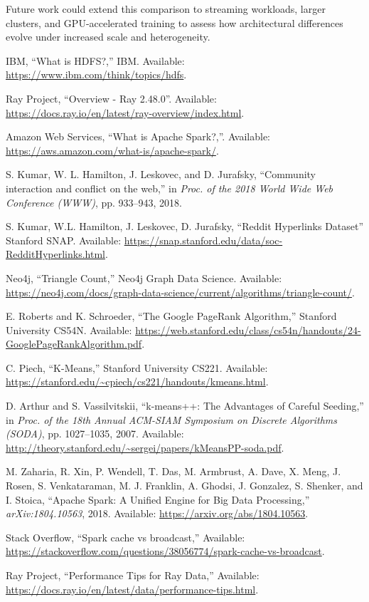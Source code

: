 \documentclass[conference]{IEEEtran}
\begin{document}
Future work could extend this comparison to streaming workloads, 
larger clusters, and GPU-accelerated training to assess 
how architectural differences evolve under increased scale and heterogeneity.



\begin{thebibliography}{00}

 IBM, ``What is HDFS?,'' IBM. Available: \url{https://www.ibm.com/think/topics/hdfs}.

 Ray Project, “Overview - Ray 2.48.0”. Available: \url{https://docs.ray.io/en/latest/ray-overview/index.html}.

 Amazon Web Services, “What is Apache Spark?,”. Available: \url{https://aws.amazon.com/what-is/apache-spark/}.

 S. Kumar, W. L. Hamilton, J. Leskovec, and D. Jurafsky, ``Community interaction and conflict on the web,'' in \textit{Proc. of the 2018 World Wide Web Conference (WWW)}, pp. 933--943, 2018.

 S. Kumar, W.L. Hamilton, J. Leskovec, D. Jurafsky, ``Reddit Hyperlinks Dataset'' Stanford SNAP. Available: \url{https://snap.stanford.edu/data/soc-RedditHyperlinks.html}.

 Neo4j, ``Triangle Count,'' Neo4j Graph Data Science. Available: \url{https://neo4j.com/docs/graph-data-science/current/algorithms/triangle-count/}.

 E. Roberts and K. Schroeder, ``The Google PageRank Algorithm,'' Stanford University CS54N. Available: \url{https://web.stanford.edu/class/cs54n/handouts/24-GooglePageRankAlgorithm.pdf}.

 C. Piech, ``K-Means,'' Stanford University CS221. Available: \url{https://stanford.edu/~cpiech/cs221/handouts/kmeans.html}.

 D. Arthur and S. Vassilvitskii, ``k-means++: The Advantages of Careful Seeding,'' in \textit{Proc. of the 18th Annual ACM-SIAM Symposium on Discrete Algorithms (SODA)}, pp. 1027--1035, 2007. Available: \url{http://theory.stanford.edu/~sergei/papers/kMeansPP-soda.pdf}. 

 M. Zaharia, R. Xin, P. Wendell, T. Das, M. Armbrust, A. Dave, X. Meng, J. Rosen, S. Venkataraman, M. J. Franklin, A. Ghodsi, J. Gonzalez, S. Shenker, and I. Stoica, ``Apache Spark: A Unified Engine for Big Data Processing,'' \textit{arXiv:1804.10563}, 2018. Available: \url{https://arxiv.org/abs/1804.10563}.

 Stack Overflow, ``Spark cache vs broadcast,'' Available: \url{https://stackoverflow.com/questions/38056774/spark-cache-vs-broadcast}.

 Ray Project, ``Performance Tips for Ray Data,'' Available: \url{https://docs.ray.io/en/latest/data/performance-tips.html}.


\end{thebibliography}
\end{document}
